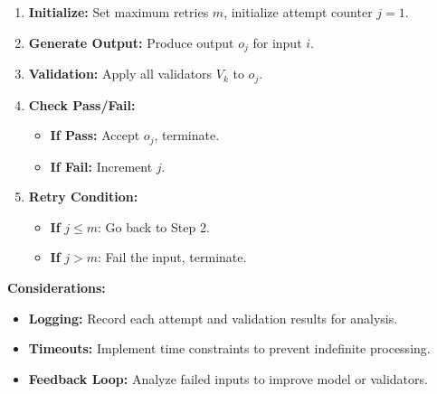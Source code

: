 \documentclass{article}
\begin{document}
\begin{enumerate}
    \item \textbf{Initialize:} Set maximum retries \( m \), initialize attempt counter \( j = 1 \).
    \item \textbf{Generate Output:} Produce output \( o_j \) for input \( i \).
    \item \textbf{Validation:} Apply all validators \( V_k \) to \( o_j \).
    \item \textbf{Check Pass/Fail:}
    \begin{itemize}
        \item \textbf{If Pass:} Accept \( o_j \), terminate.
        \item \textbf{If Fail:} Increment \( j \).
    \end{itemize}
    \item \textbf{Retry Condition:}
    \begin{itemize}
        \item \textbf{If } \( j \leq m \): Go back to Step 2.
        \item \textbf{If } \( j > m \): Fail the input, terminate.
    \end{itemize}
\end{enumerate}

\textbf{Considerations:}

\begin{itemize}
    \item \textbf{Logging:} Record each attempt and validation results for analysis.
    \item \textbf{Timeouts:} Implement time constraints to prevent indefinite processing.
    \item \textbf{Feedback Loop:} Analyze failed inputs to improve model or validators.
\end{itemize}
\end{document}
